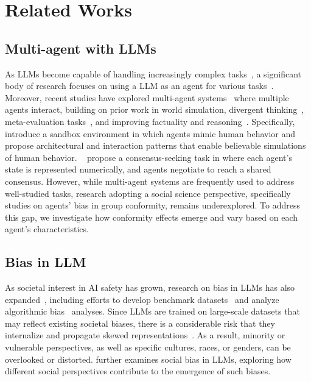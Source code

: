 \documentclass[11pt]{article}
\begin{document}
\section{Related Works}
\subsection{Multi-agent with LLMs}
As LLMs become capable of handling increasingly complex tasks~\citep{kevian2024capabilities, achiam2023gpt, team2024gemini, dubey2024llama}, a significant body of research focuses on using a LLM as an agent for various tasks~\citep{xi2023rise, kim2023draft, mathur2024advancing, huang2024understanding}. Moreover, recent studies have explored multi-agent systems~\citep{wang2024survey, guo2024large} where multiple agents interact, building on prior work in world simulation, divergent thinking~\citep{liang2023encouraging}, meta-evaluation tasks~\citep{chan2023chateval, kim2024debate}, and improving factuality and reasoning~\citep{du2023improving}. Specifically,~\citep{park2023generative} introduce a sandbox environment in which agents mimic human behavior and propose architectural and interaction patterns that enable believable simulations of human behavior. ~\citep{chen2023multi} propose a consensus-seeking task in where each agent's state is represented numerically, and agents negotiate to reach a shared consensus. However, while multi-agent systems are frequently used to address well-studied tasks, research adopting a social science perspective, specifically studies on agents’ bias in group conformity, remains underexplored. To address this gap, we investigate how conformity effects emerge and vary based on each agent’s characteristics.


\subsection{Bias in LLM}
As societal interest in AI safety has grown, research on bias in LLMs has also expanded~\citep{gallegos2024bias, xu2024pride, shin2024ask, tjuatja2024llms}, including efforts to develop benchmark datasets~\citep{lee2023kosbi, gupta2023bias} and analyze algorithmic bias~\citep{xiao2024algorithmic} analyses. Since LLMs are trained on large-scale datasets that may reflect existing societal biases, there is a considerable risk that they internalize and propagate skewed representations~\citep{bender2021dangers, liu2024datasets}. As a result, minority or vulnerable perspectives, as well as specific cultures, races, or genders, can be overlooked or distorted. \citep{tjuatja2024llms} further examines social bias in LLMs, exploring how different social perspectives contribute to the emergence of such biases. 
\end{document}
